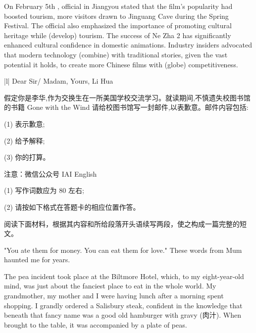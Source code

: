 \documentclass{英语试卷}
\begin{document}
\par On February 5th ,  official in Jiangyou stated that the film's popularity had boosted tourism,  more visitors drawn to Jinguang Cave during the Spring Festival. The official also emphasized the importance of promoting cultural heritage while (develop) tourism. The success of Ne Zha 2 has significantly enhanced cultural confidence in domestic animations. Industry insiders advocated that modern technology (combine) with traditional stories, given the vast potential it holds, to create more Chinese films with (globe) competitiveness.\par
{}
\par\vspace{0.4em}
\begin{center}\begin{tabular}{{|l|}}
\hline
Dear Sir/ Madam, Yours, Li Hua \\
\hline
\end{tabular}\end{center}
\vspace{0.4em}
\par 假定你是李华,作为交换生在一所美国学校交流学习。就读期间,不慎遗失校图书馆的书籍 Gone with the Wind 请给校图书馆写一封邮件,以表歉意。邮件内容包括:\par
\par (1) 表示歉意;\par
\par (2) 给予解释;\par
\par (3) 你的打算。\par
\par 注意：微信公众号 IAI English\par
\par (1) 写作词数应为 80 左右;\par
\par (2) 请按如下格式在答题卡的相应位置作答。\par
{}
\par 阅读下面材料，根据其内容和所给段落开头语续写两段，使之构成一篇完整的短文。\par
\par "You ate them for money. You can eat them for love." These words from Mum haunted me for years.\par
\par The pea incident took place at the Biltmore Hotel, which, to my eight-year-old mind, was just about the fanciest place to eat in the whole world. My grandmother, my mother and I were having lunch after a morning spent shopping. I grandly ordered a Salisbury steak, confident in the knowledge that beneath that fancy name was a good old hamburger with gravy (肉汁). When brought to the table, it was accompanied by a plate of peas.\par
\end{document}
